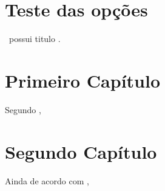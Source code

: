 \documentclass[english, qualit]{ppgccufscar2}
\begin{document}
	\imprimircapa
	\imprimirfolhaderosto
	\textual
	\chapter{Teste das opções}
	\PPGtipodoc\ possui titulo \PPGtipotitulo.
	\imprimirpreambulo
	\chapter{Primeiro Capítulo}	
	\lipsum \cite{2004_kitchenham}
	Segundo , \lipsum
	
	\chapter{Segundo Capítulo}
	Ainda de acordo com , \lipsum
	
	\postextual
	
\end{document}
